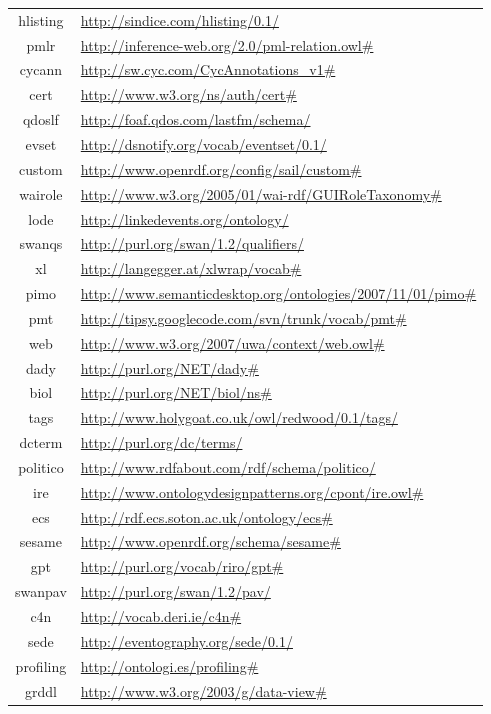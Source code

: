 \documentclass{article}
\begin{document}
\begin{longtable}{ c | p{8cm} }
hlisting & \url{http://sindice.com/hlisting/0.1/} \\
pmlr & \url{http://inference-web.org/2.0/pml-relation.owl#} \\
cycann & \url{http://sw.cyc.com/CycAnnotations_v1#} \\
cert & \url{http://www.w3.org/ns/auth/cert#} \\
qdoslf & \url{http://foaf.qdos.com/lastfm/schema/} \\
evset & \url{http://dsnotify.org/vocab/eventset/0.1/} \\
custom & \url{http://www.openrdf.org/config/sail/custom#} \\
wairole & \url{http://www.w3.org/2005/01/wai-rdf/GUIRoleTaxonomy#} \\
lode & \url{http://linkedevents.org/ontology/} \\
swanqs & \url{http://purl.org/swan/1.2/qualifiers/} \\
xl & \url{http://langegger.at/xlwrap/vocab#} \\
pimo & \url{http://www.semanticdesktop.org/ontologies/2007/11/01/pimo#} \\
pmt & \url{http://tipsy.googlecode.com/svn/trunk/vocab/pmt#} \\
web & \url{http://www.w3.org/2007/uwa/context/web.owl#} \\
dady & \url{http://purl.org/NET/dady#} \\
biol & \url{http://purl.org/NET/biol/ns#} \\
tags & \url{http://www.holygoat.co.uk/owl/redwood/0.1/tags/} \\
dcterm & \url{http://purl.org/dc/terms/} \\
politico & \url{http://www.rdfabout.com/rdf/schema/politico/} \\
ire & \url{http://www.ontologydesignpatterns.org/cpont/ire.owl#} \\
ecs & \url{http://rdf.ecs.soton.ac.uk/ontology/ecs#} \\
sesame & \url{http://www.openrdf.org/schema/sesame#} \\
gpt & \url{http://purl.org/vocab/riro/gpt#} \\
swanpav & \url{http://purl.org/swan/1.2/pav/} \\
c4n & \url{http://vocab.deri.ie/c4n#} \\
sede & \url{http://eventography.org/sede/0.1/} \\
profiling & \url{http://ontologi.es/profiling#} \\
grddl & \url{http://www.w3.org/2003/g/data-view#} \\

\end{longtable}
\end{document}
